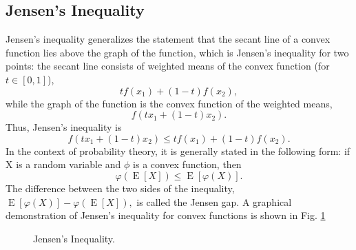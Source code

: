 \subsection{Jensen's Inequality}
Jensen's inequality generalizes the statement that the secant line of a convex function lies {\elevenit above}\/ the graph of the function, 
which is Jensen's inequality for two points: the secant line consists of weighted means of the convex function (for $t \in [0,1]$),
$$t f(x_{1}) + (1-t) f(x_{2}),$$ while the graph of the function is the convex function of the weighted means,
$$f\left(tx_{1}+(1-t)x_{2}\right).$$
Thus, Jensen's inequality is $${\displaystyle f\left(tx_{1}+(1-t)x_{2}\right)\leq tf(x_{1})+(1-t)f(x_{2}).}$$
In the context of probability theory, it is generally stated in the following form: if X is a random variable and $\phi$ is a convex function, then
$${\displaystyle \varphi \left(\operatorname {E} [X]\right)\leq \operatorname {E} \left[\varphi (X)\right].}$$
The difference between the two sides of the inequality, 
${\displaystyle \operatorname {E} \left[\varphi (X)\right]-\varphi \left(\operatorname {E} [X]\right)}, $ is called the Jensen gap. 
\clearpage
A graphical demonstration of Jensen's inequality for convex functions is shown in Fig. \ref{fig:Jensen}
\begin{figure}[hb]
\caption[fig1]{Jensen's Inequality.}
\label{fig:Jensen}
\end{figure}
